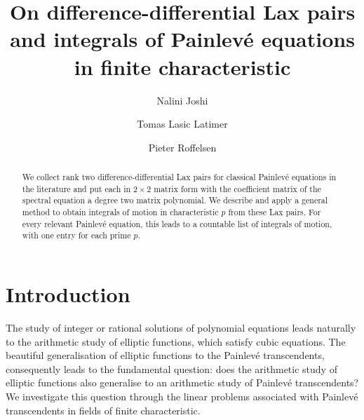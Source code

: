 \documentclass[a4paper,reqno]{amsart}
\title[On difference-differential Lax pairs and integrals of Painlev\'e equations]{On difference-differential Lax pairs and integrals of Painlev\'e equations in finite characteristic}
\date{}
\author[Nalini Joshi]{Nalini Joshi}
\author{Tomas Lasic Latimer}
\author{Pieter Roffelsen}
\numberwithin{equation}{section}
\numberwithin{figure}{section}
\theoremstyle{remark}
\begin{document}
\begin{abstract}
We collect rank two difference-differential Lax pairs for classical Painlev\'e equations in the literature and put each in $2\times 2$ matrix form with the coefficient matrix of the spectral equation a degree two matrix polynomial. We describe and apply a general method to obtain integrals of motion in characteristic $p$ from these Lax pairs. For every relevant Painlev\'e equation, this leads to a countable list of integrals of motion, with one entry for each prime $p$. 
\end{abstract}



\maketitle

\tableofcontents

\section{Introduction}
The study of integer or rational solutions of polynomial equations leads naturally to the arithmetic study of elliptic functions, which satisfy cubic equations. The beautiful generalisation of elliptic functions to the Painlev\'e transcendents, consequently leads to the fundamental question: does the arithmetic study of elliptic functions also generalise to an arithmetic study of Painlev\'e transcendents? We investigate this question through the linear problems associated with Painlev\'e transcendents in fields of finite characteristic.
\end{document}
